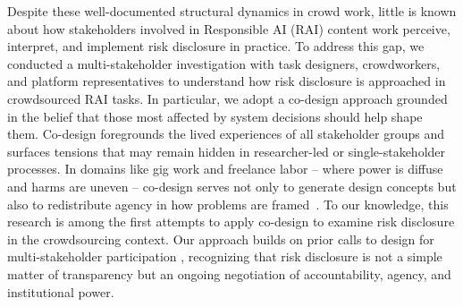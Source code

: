 Despite these well-documented structural dynamics in crowd work, little is known about how stakeholders involved in Responsible AI (RAI) content work perceive, interpret, and implement risk disclosure in practice. %
To address this gap, we conducted a multi-stakeholder investigation with task designers, crowdworkers, and platform representatives to understand how risk disclosure is approached in crowdsourced RAI tasks. In particular, we adopt a co-design approach grounded in the belief that those most affected by system decisions should help shape them. Co-design foregrounds the lived experiences of all stakeholder groups and surfaces tensions that may remain hidden in researcher-led or single-stakeholder processes. In domains like gig work and freelance labor -- where power is diffuse and harms are uneven -- co-design serves not only to generate design concepts but also to redistribute agency in how problems are framed~\cite{huang2024design, hsieh_designing_2023}.
To our knowledge, this research is among the first attempts to apply co-design to examine risk disclosure in the crowdsourcing context. Our approach builds on prior calls to design for multi-stakeholder participation  \cite{vines2013configuring}, recognizing that risk disclosure is not a simple matter of transparency but an ongoing negotiation of accountability, agency, and institutional power.


